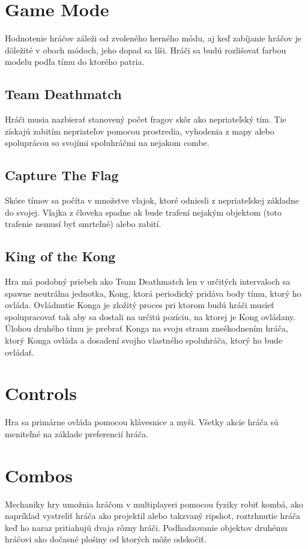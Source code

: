 \documentclass[a4paper]{report}
\begin{document}
\section{Game Mode}
Hodnotenie hráčov záleži od zvoleného herného módu, aj keď zabíjanie hráčov je dôležité v oboch módoch, jeho dopad sa líši. Hráči sa budú rozlišovať farbou modelu podľa tímu do ktorého patria.
\subsection{Team Deathmatch}
Hráči musia nazbierať stanovený počet fragov skôr ako nepriateľský tím. Tie získajú zabitím nepriateľov pomocou prostredia, vyhodenia z mapy alebo spoluprácou so svojími spoluhráčmi na nejakom combe.

\subsection{Capture The Flag}
Skóre tímov sa počíta v množstve vlajok, ktoré odniesli z nepriateľskej základne do svojej. Vlajka z človeka spadne ak bude trafení nejakým objektom (toto trafenie nemusí byť smrteľné) alebo zabití.

\subsection{King of the Kong}
Hra má podobný priebeh ako Team Deathmatch len v určitých intervaloch sa spawne neutrálna jednotka, Kong, ktorá periodický pridáva body tímu, ktorý ho ovláda. Ovládnutie Konga je zložitý proces pri ktorom budú hráči musieť spolupracovať tak aby sa dostali na určitú pozíciu, na ktorej je Kong ovládany. Úlohou druhého tímu je prebrať Konga na svoju stranu zneškodnením hráča, ktorý Konga ovláda a dosadení svojho vlastného spoluhráča, ktorý ho bude ovládať.
 
\section{Controls}
Hra sa primárne ovláda pomocou klávesnice a myši. Všetky akcie hráča sú meniteľné na základe preferencií hráča. 

\section{Combos}
Mechaniky hry umožnia hráčom v multiplayeri pomocou fyziky robiť kombá, ako napríklad vystreliť hráča ako projektil alebo takzvaný ripshot, roztrhnutie hráča keď ho naraz pritiahujú dvaja rôzny hráči. Podhadzovanie objektov druhému hráčovi ako dočasné plošiny od ktorých môže odskočiť. 
\end{document}
